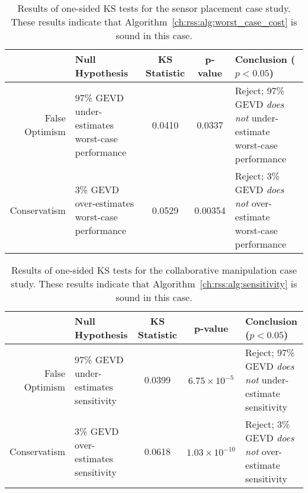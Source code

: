\begin{table}[thb]
    \renewcommand{\arraystretch}{1.5}
    \centering
    \begin{tabular}{r||p{4cm}|c|c|p{5cm}}
                       & Null Hypothesis                                  & \shortstack{KS                                                                                       \\ Statistic} & p-value & Conclusion ($p < 0.05$)                                                   \\ \hline\hline
        False Optimism & 97\% GEVD under-estimates worst-case performance & 0.0410         & 0.0337  & Reject; 97\% GEVD \textit{does not} under-estimate worst-case performance \\ \hline
        Conservatism   & 3\% GEVD over-estimates worst-case performance   & 0.0529         & 0.00354 & Reject; 3\% GEVD \textit{does not} over-estimate worst-case performance
    \end{tabular}
    \caption{Results of one-sided KS tests for the sensor placement case study. These results indicate that Algorithm~\ref{ch:rss:alg:worst_case_cost} is sound in this case.}\label{ch:rss:tab:ks_test_agv}
\end{table}

\begin{table}[thb]
    \renewcommand{\arraystretch}{1.5}
    \centering
    \begin{tabular}{r||p{4cm}|c|c|p{5cm}}
                       & Null Hypothesis                       & \shortstack{KS                                                                                         \\ Statistic} & p-value              & Conclusion ($p < 0.05$)                                        \\ \hline\hline
        False Optimism & 97\% GEVD under-estimates sensitivity & 0.0399         & $6.75\times10^{-5}$  & Reject; 97\% GEVD \textit{does not} under-estimate sensitivity \\ \hline
        Conservatism   & 3\% GEVD over-estimates sensitivity   & 0.0618         & $1.03\times10^{-10}$ & Reject; 3\% GEVD \textit{does not} over-estimate sensitivity
    \end{tabular}
    \caption{Results of one-sided KS tests for the collaborative manipulation case study. These results indicate that Algorithm~\ref{ch:rss:alg:sensitivity} is sound in this case.}\label{ch:rss:tab:ks_test_mam}
\end{table}

